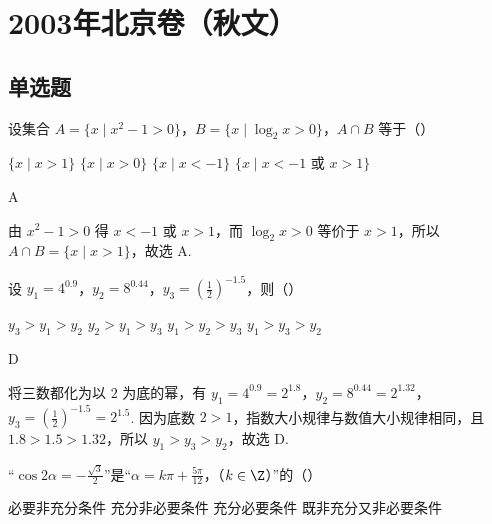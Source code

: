 
\chapter{2003年北京卷（秋文）}
\section{单选题}
\begin{problem}
设集合 \(A = \{x \mid x^2 - 1 > 0\}\)，\(B = \{x \mid \log_2 x > 0\}\)，\(A \cap B\) 等于（\quad）

\choices
    {\(\{x \mid x > 1\}\)}
    {\(\{x \mid x > 0\}\)}
    {\(\{x \mid x < -1\}\)}
    {\(\{x \mid x < -1 \text{\ 或\ } x > 1\}\)}
\end{problem}

\begin{answer}
A
\end{answer}

\begin{solution}
由 \(x^2-1>0\) 得 \(x<-1\) 或 \(x>1\)，而 \(\log_2x>0\) 等价于 \(x>1\)，所以 \(A\cap B=\{x\mid x>1\}\)，故选 A.
\end{solution}

\begin{problem}
设 \(y_1 = 4^{0.9}\)，\(y_2 = 8^{0.44}\)，\(y_3 = \left(\frac{1}{2}\right)^{-1.5}\)，则（\quad）

\choices
    {\(y_3 > y_1 > y_2\)}
    {\(y_2 > y_1 > y_3\)}
    {\(y_1 > y_2 > y_3\)}
    {\(y_1 > y_3 > y_2\)}
\end{problem}

\begin{answer}
D
\end{answer}

\begin{solution}
将三数都化为以 \(2\) 为底的幂，有 \(y_1=4^{0.9}=2^{1.8}\)，\(y_2=8^{0.44}=2^{1.32}\)，\(y_3=(\frac{1}{2})^{-1.5}=2^{1.5}\). 因为底数 \(2>1\)，指数大小规律与数值大小规律相同，且 \(1.8>1.5>1.32\)，所以 \(y_1>y_3>y_2\)，故选 D.
\end{solution}

\begin{problem}
“\(\cos 2\alpha = -\frac{\sqrt{3}}{2}\)”是“\(\alpha = k\pi + \frac{5\pi}{12}\)，（\(k \in \Z\)）”的（\quad）

\choices
    {必要非充分条件}
    {充分非必要条件}
    {充分必要条件}
    {既非充分又非必要条件}
\end{problem}

